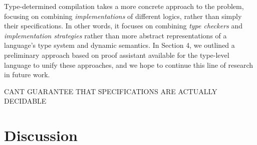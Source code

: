 \documentclass{llncs}
\begin{document}
Type-determined compilation takes a more concrete approach to the problem, focusing on combining {\it implementations} of different\- logics, rather than simply their specifications. In other words, it focuses on combining {\it type checkers} and {\it implementation strategies} rather than more abstract representations of a language's type system and dynamic semantics. In Section 4, we outlined a preliminary approach based on proof assistant available for the type-level language to unify these approaches, and we hope to continue this line of research in future work.

CANT GUARANTEE THAT SPECIFICATIONS ARE ACTUALLY DECIDABLE 
\section{Discussion}\label{discussion}


\end{document}
